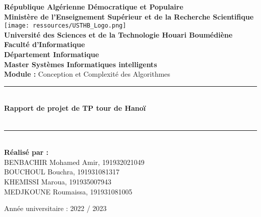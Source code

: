 \documentclass[12pt]{report}
\newcommand{\HRule}{\rule{\linewidth}{0.5mm}}
\begin{document}
    \begin{titlepage}
        \begin{center}
            \textbf{République Algérienne Démocratique et Populaire}\\
            \textbf{Ministère de l'Enseignement Supérieur et de la Recherche Scientifique}\\[1cm]
            
            \texttt{[image: ressources/USTHB\_Logo.png]}\\[1cm]
            
            \large
            \textbf{Université des Sciences et de la Technologie Houari Boumédiène}\\[0.5cm]
            \textbf{Faculté d'Informatique}\\
            \textbf{Département Informatique}\\[0.5cm]

            \Large
            \textbf{Master Systèmes Informatiques intelligents}\\[0.5cm]
            
            \textbf{Module :} Conception et Complexité des Algorithmes

            \HRule \\[0.4cm]
            \LARGE{\textbf{Rapport de projet de TP tour de Hanoï}\\
            \textit{}\\[0.4cm]}
            \HRule \\[2cm]
            
            \large
            \textbf{Réalisé par :}\\
            BENBACHIR Mohamed Amir, 191932021049\\
            BOUCHOUL Bouchra, 191931081317\\
            KHEMISSI Maroua, 191935007943\\
            MEDJKOUNE Roumaissa, 191931081005
            
            \vfill
            Année universitaire : 2022 / 2023
        \end{center}
    \end{titlepage}
    \normalsize
    \tableofcontents
    
    
    \newpage
    \onehalfspacing
    
    
   
    \newpage
    \onehalfspacing
    
    
    \newpage
    \onehalfspacing
    
    
   
    
    \newpage
    \onehalfspacing
    
    
    \newpage
    \onehalfspacing
    
    
    \newpage
    \onehalfspacing
    
    
   
\end{document}
